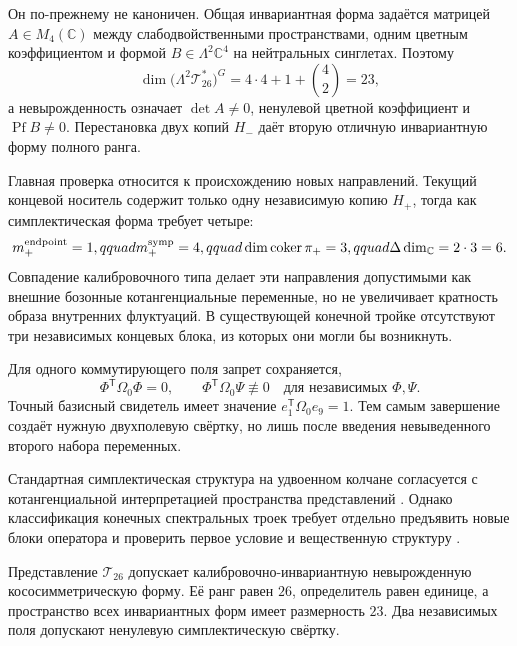 Он по-прежнему не каноничен. Общая инвариантная форма задаётся матрицей
$A\in M_4(\mathbb C)$ между слабодвойственными пространствами, одним
цветным коэффициентом и формой $B\in\Lambda^2\mathbb C^4$ на нейтральных
синглетах. Поэтому
\begin{equation}
 \dim\bigl(\Lambda^2\mathcal T_{26}^*\bigr)^G
 =4\cdot4+1+\binom42=23,
 \label{eq:v8-minimal-symplectic-form-family}
\end{equation}
а невырожденность означает $\det A\neq0$, ненулевой цветной коэффициент и
$\operatorname{Pf}B\neq0$. Перестановка двух копий $H_-$ даёт вторую
отличную инвариантную форму полного ранга.

Главная проверка относится к происхождению новых направлений. Текущий
концевой носитель содержит только одну независимую копию $H_+$, тогда как
симплектическая форма требует четыре:
\begin{equation}
 m_+^{\rm endpoint}=1,qquad m_+^{\rm symp}=4,qquad
 \dim\operatorname{coker}\pi_+=3,qquad
 \Delta\dim_{\mathbb C}=2\cdot3=6.
 \label{eq:v8-minimal-symplectic-endpoint-deficit}
\end{equation}
Совпадение калибровочного типа делает эти направления допустимыми как
внешние бозонные котангенциальные переменные, но не увеличивает кратность
образа внутренних флуктуаций. В существующей конечной тройке отсутствуют
три независимых концевых блока, из которых они могли бы возникнуть.

Для одного коммутирующего поля запрет сохраняется,
\begin{equation}
 \Phi^{\mathsf T}\Omega_0\Phi=0,
 \qquad
 \Phi^{\mathsf T}\Omega_0\Psi\not\equiv0
 \quad\text{для независимых }\Phi,\Psi.
 \label{eq:v8-minimal-symplectic-two-field-pairing}
\end{equation}
Точный базисный свидетель имеет значение $e_1^{\mathsf T}\Omega_0e_9=1$.
Тем самым завершение создаёт нужную двухполевую свёртку, но лишь после
введения невыведенного второго набора переменных.

Стандартная симплектическая структура на удвоенном колчане согласуется с
котангенциальной интерпретацией пространства представлений
\cite{v8-minimal-symplectic-crawley-boevey,v8-minimal-symplectic-harada-wilkin}.
Однако классификация конечных спектральных троек требует отдельно предъявить
новые блоки оператора и проверить первое условие и вещественную структуру
\cite{v8-minimal-symplectic-krajewski}.

\begin{theorem}
Представление $\mathcal T_{26}$ допускает калибровочно-инвариантную
невырожденную кососимметрическую форму. Её ранг равен $26$, определитель
равен единице, а пространство всех инвариантных форм имеет размерность
$23$. Два независимых поля допускают ненулевую симплектическую свёртку.
\end{theorem}

